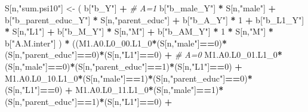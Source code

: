 \documentclass[
]{book}
\newenvironment{Shaded}{\begin{snugshade}}{\end{snugshade}}
\newcommand{\CommentTok}[1]{\textcolor[rgb]{0.56,0.35,0.01}{\textit{#1}}}
\newcommand{\DecValTok}[1]{\textcolor[rgb]{0.00,0.00,0.81}{#1}}
\newcommand{\NormalTok}[1]{#1}
\newcommand{\OtherTok}[1]{\textcolor[rgb]{0.56,0.35,0.01}{#1}}
\newcommand{\SpecialCharTok}[1]{\textcolor[rgb]{0.81,0.36,0.00}{\textbf{#1}}}
\newcommand{\StringTok}[1]{\textcolor[rgb]{0.31,0.60,0.02}{#1}}
\begin{document}
\begin{Shaded}
\begin{Highlighting}[]
\NormalTok{    S[n,}\StringTok{"sum.psi10"}\NormalTok{] }\OtherTok{\textless{}{-}}\NormalTok{  ( b[}\StringTok{"b\_Y"}\NormalTok{] }\SpecialCharTok{+}                                            \CommentTok{\# A=1}
\NormalTok{                             b[}\StringTok{"b\_male\_Y"}\NormalTok{] }\SpecialCharTok{*}\NormalTok{ S[n,}\StringTok{"male"}\NormalTok{] }\SpecialCharTok{+} 
\NormalTok{                             b[}\StringTok{"b\_parent\_educ\_Y"}\NormalTok{] }\SpecialCharTok{*}\NormalTok{ S[n,}\StringTok{"parent\_educ"}\NormalTok{] }\SpecialCharTok{+} 
\NormalTok{                             b[}\StringTok{"b\_A\_Y"}\NormalTok{] }\SpecialCharTok{*} \DecValTok{1} \SpecialCharTok{+} 
\NormalTok{                             b[}\StringTok{"b\_L1\_Y"}\NormalTok{] }\SpecialCharTok{*}\NormalTok{ S[n,}\StringTok{"L1"}\NormalTok{] }\SpecialCharTok{+}
\NormalTok{                             b[}\StringTok{"b\_M\_Y"}\NormalTok{] }\SpecialCharTok{*}\NormalTok{ S[n,}\StringTok{"M"}\NormalTok{] }\SpecialCharTok{+}
\NormalTok{                             b[}\StringTok{"b\_AM\_Y"}\NormalTok{] }\SpecialCharTok{*} \DecValTok{1} \SpecialCharTok{*}\NormalTok{ S[n,}\StringTok{"M"}\NormalTok{] }\SpecialCharTok{*}\NormalTok{ b[}\StringTok{"A.M.inter"}\NormalTok{] ) }\SpecialCharTok{*}
\NormalTok{      ((M1.A0.L0\_00.L1\_0}\SpecialCharTok{*}\NormalTok{(S[n,}\StringTok{"male"}\NormalTok{]}\SpecialCharTok{==}\DecValTok{0}\NormalTok{)}\SpecialCharTok{*}\NormalTok{(S[n,}\StringTok{"parent\_educ"}\NormalTok{]}\SpecialCharTok{==}\DecValTok{0}\NormalTok{)}\SpecialCharTok{*}\NormalTok{(S[n,}\StringTok{"L1"}\NormalTok{]}\SpecialCharTok{==}\DecValTok{0}\NormalTok{) }\SpecialCharTok{+} \CommentTok{\# A\textquotesingle{}=0}
\NormalTok{          M1.A0.L0\_01.L1\_0}\SpecialCharTok{*}\NormalTok{(S[n,}\StringTok{"male"}\NormalTok{]}\SpecialCharTok{==}\DecValTok{0}\NormalTok{)}\SpecialCharTok{*}\NormalTok{(S[n,}\StringTok{"parent\_educ"}\NormalTok{]}\SpecialCharTok{==}\DecValTok{1}\NormalTok{)}\SpecialCharTok{*}\NormalTok{(S[n,}\StringTok{"L1"}\NormalTok{]}\SpecialCharTok{==}\DecValTok{0}\NormalTok{) }\SpecialCharTok{+}
\NormalTok{          M1.A0.L0\_10.L1\_0}\SpecialCharTok{*}\NormalTok{(S[n,}\StringTok{"male"}\NormalTok{]}\SpecialCharTok{==}\DecValTok{1}\NormalTok{)}\SpecialCharTok{*}\NormalTok{(S[n,}\StringTok{"parent\_educ"}\NormalTok{]}\SpecialCharTok{==}\DecValTok{0}\NormalTok{)}\SpecialCharTok{*}\NormalTok{(S[n,}\StringTok{"L1"}\NormalTok{]}\SpecialCharTok{==}\DecValTok{0}\NormalTok{) }\SpecialCharTok{+} 
\NormalTok{          M1.A0.L0\_11.L1\_0}\SpecialCharTok{*}\NormalTok{(S[n,}\StringTok{"male"}\NormalTok{]}\SpecialCharTok{==}\DecValTok{1}\NormalTok{)}\SpecialCharTok{*}\NormalTok{(S[n,}\StringTok{"parent\_educ"}\NormalTok{]}\SpecialCharTok{==}\DecValTok{1}\NormalTok{)}\SpecialCharTok{*}\NormalTok{(S[n,}\StringTok{"L1"}\NormalTok{]}\SpecialCharTok{==}\DecValTok{0}\NormalTok{) }\SpecialCharTok{+}

\end{Highlighting}
\end{Shaded}
\end{document}
